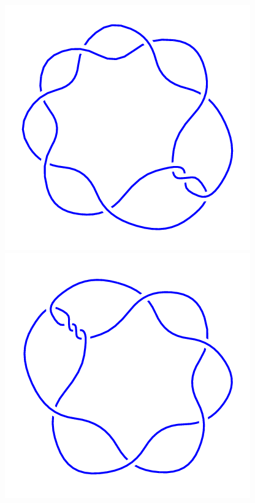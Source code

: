 \begin{figure}[H]
\begin{minipage}[b]{.18\linewidth}
	\end{minipage}
	\begin{minipage}[b]{.18\linewidth}
		\centering
		\includegraphics[width=\linewidth]{../data/9_3.png}
	\end{minipage}
	\begin{minipage}[b]{.18\linewidth}
		\centering
		\includegraphics[width=\linewidth]{../data/9_4.png}

\end{minipage}
\end{figure}
